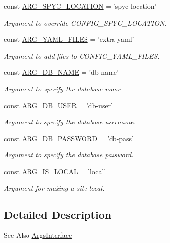 \begin{DoxyCompactItemize}
const \hyperlink{group__args_ga73d8fbeb725231563d894795457b1adf}{A\-R\-G\-\_\-\-S\-P\-Y\-C\-\_\-\-L\-O\-C\-A\-T\-I\-O\-N} = 'spyc-\/location'
\begin{DoxyCompactList}\small\item\em Argument to override C\-O\-N\-F\-I\-G\-\_\-\-S\-P\-Y\-C\-\_\-\-L\-O\-C\-A\-T\-I\-O\-N. \end{DoxyCompactList}\item 
const \hyperlink{group__args_ga17328c6a748e7ced71ea6ed9b0107742}{A\-R\-G\-\_\-\-Y\-A\-M\-L\-\_\-\-F\-I\-L\-E\-S} = 'extra-\/yaml'
\begin{DoxyCompactList}\small\item\em Argument to add files to C\-O\-N\-F\-I\-G\-\_\-\-Y\-A\-M\-L\-\_\-\-F\-I\-L\-E\-S. \end{DoxyCompactList}\item 
const \hyperlink{group__args_ga98d79ebbd1d09c1229a78e064d36e935}{A\-R\-G\-\_\-\-D\-B\-\_\-\-N\-A\-M\-E} = 'db-\/name'
\begin{DoxyCompactList}\small\item\em Argument to specify the database name. \end{DoxyCompactList}\item 
const \hyperlink{group__args_ga8a8e04a675209a2384eb4cc98004f1f2}{A\-R\-G\-\_\-\-D\-B\-\_\-\-U\-S\-E\-R} = 'db-\/user'
\begin{DoxyCompactList}\small\item\em Argument to specify the database username. \end{DoxyCompactList}\item 
const \hyperlink{group__args_ga3cb40cb5a16ad8799b2d00c1d799bac0}{A\-R\-G\-\_\-\-D\-B\-\_\-\-P\-A\-S\-S\-W\-O\-R\-D} = 'db-\/pass'
\begin{DoxyCompactList}\small\item\em Argument to specify the database password. \end{DoxyCompactList}\item 
const \hyperlink{group__args_gab4bc1e3dae7e4e4c739fd5f257a43aae}{A\-R\-G\-\_\-\-I\-S\-\_\-\-L\-O\-C\-A\-L} = 'local'
\begin{DoxyCompactList}\small\item\em Argument for making a site local. \end{DoxyCompactList}\end{DoxyCompactItemize}


\subsection{Detailed Description}
\begin{DoxySeeAlso}{See Also}
\hyperlink{interfaceArgsInterface}{Args\-Interface} 
\end{DoxySeeAlso}


